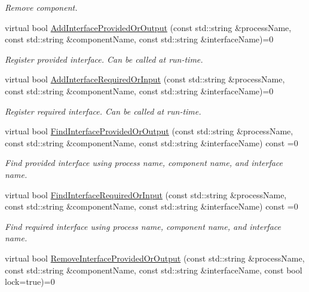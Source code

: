 \begin{DoxyCompactItemize}
\begin{DoxyCompactList}\small\item\em Remove component. \end{DoxyCompactList}\item 
virtual bool \hyperlink{classmts_manager_global_interface_a10365f3c2d04f36170c0551cad2281c5}{Add\+Interface\+Provided\+Or\+Output} (const std\+::string \&process\+Name, const std\+::string \&component\+Name, const std\+::string \&interface\+Name)=0
\begin{DoxyCompactList}\small\item\em Register provided interface. Can be called at run-\/time. \end{DoxyCompactList}\item 
virtual bool \hyperlink{classmts_manager_global_interface_abc65961f2d8d4344a79f40757bbb6e44}{Add\+Interface\+Required\+Or\+Input} (const std\+::string \&process\+Name, const std\+::string \&component\+Name, const std\+::string \&interface\+Name)=0
\begin{DoxyCompactList}\small\item\em Register required interface. Can be called at run-\/time. \end{DoxyCompactList}\item 
virtual bool \hyperlink{classmts_manager_global_interface_aa83816a7945e79c0bc1f52de965d7368}{Find\+Interface\+Provided\+Or\+Output} (const std\+::string \&process\+Name, const std\+::string \&component\+Name, const std\+::string \&interface\+Name) const =0
\begin{DoxyCompactList}\small\item\em Find provided interface using process name, component name, and interface name. \end{DoxyCompactList}\item 
virtual bool \hyperlink{classmts_manager_global_interface_a9d8db8039ba51721068466ec815c92ea}{Find\+Interface\+Required\+Or\+Input} (const std\+::string \&process\+Name, const std\+::string \&component\+Name, const std\+::string \&interface\+Name) const =0
\begin{DoxyCompactList}\small\item\em Find required interface using process name, component name, and interface name. \end{DoxyCompactList}\item 
virtual bool \hyperlink{classmts_manager_global_interface_afe6b343e84ce4a259d3d6e7df4e750a4}{Remove\+Interface\+Provided\+Or\+Output} (const std\+::string \&process\+Name, const std\+::string \&component\+Name, const std\+::string \&interface\+Name, const bool lock=true)=0

\end{DoxyCompactItemize}
